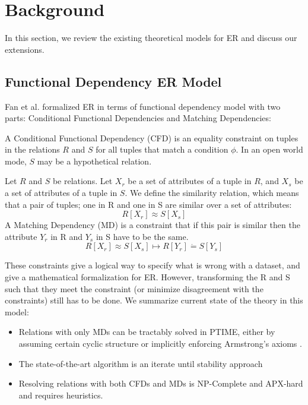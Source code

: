 \section{Background}
In this section, we review the existing theoretical models for ER and 
discuss our extensions.

\subsection{Functional Dependency ER Model}
Fan et al. \cite{fan2008conditional} formalized ER in terms of functional dependency model with two parts: Conditional Functional Dependencies and Matching Dependencies:
\begin{definition}
A Conditional Functional Dependency (CFD) is an equality constraint on tuples in the relations $R$ and $S$
for all tuples that match a condition $\phi$. 
In an open world mode, $S$ may be a hypothetical relation.
\end{definition}

\begin{definition}
Let $R$ and $S$ be relations. Let $X_r$ be a set of attributes of a tuple in $R$, and $X_s$ be a set of attributes of a tuple in $S$.
We define the similarity relation, which means that a pair of tuples; one in R and one in S are similar over a set of attributes: \[ R[X_r] \approx S[X_s] \]
A Matching Dependency (MD) is a constraint that if this pair is similar then the attribute $Y_r$ in R and $Y_s$ in S have to be the same.
\[ R[X_r] \approx S[X_s] \mapsto R[Y_r] \dot{=} S[Y_s]\]
\end{definition}

These constraints give a logical way to specify what is wrong with a dataset, and give a mathematical formalization for ER.
However, transforming the R and S such that they meet the constraint (or minimize disagreement with the constraints) still has to be done.
We summarize current state of the theory in this model:
\begin{itemize}
\item Relations with only MDs can be tractably solved in PTIME, either by assuming certain cyclic structure \cite{bertossi2013data} or implicitly enforcing Armstrong's axioms \cite{fan2011dynamic}.
\item The state-of-the-art algorithm is an iterate until stability approach \cite{bertossi2013data, fan2011dynamic}
\item Resolving relations with both CFDs and MDs is NP-Complete and APX-hard \cite{wang2014towards} and requires heuristics.
\end{itemize}

